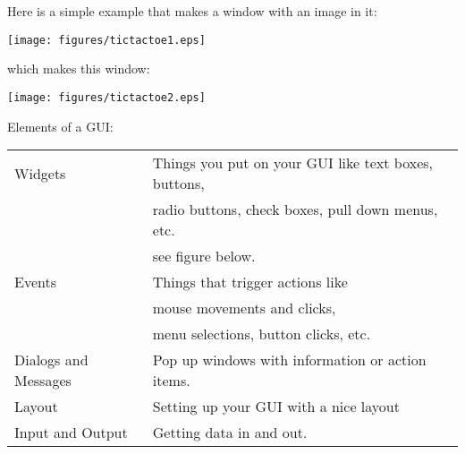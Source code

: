 {{\noindent Here is a simple example that makes a window with an image in it:


\texttt{[image: figures/tictactoe1.eps]} 

\noindent which makes this window:

\texttt{[image: figures/tictactoe2.eps]} 




%
\eject
\centerline{Elements of a GUI:}

\begin{tabular}{|l|l|}
\hline
Widgets &Things you put on your GUI like text boxes, buttons, \\
& radio buttons, check boxes, pull down menus, etc.\\
& see figure below.\\
\hline
Events& Things that trigger actions like \\
& mouse movements and clicks, \\
& menu selections,  button clicks, etc.\\
\hline
 Dialogs and Messages & Pop up windows with information or action items.\\
  \hline
 Layout &   Setting up your GUI with a nice layout\\
  \hline
 Input and Output& Getting data in and out.\\
 \hline
\end{tabular}

}}
